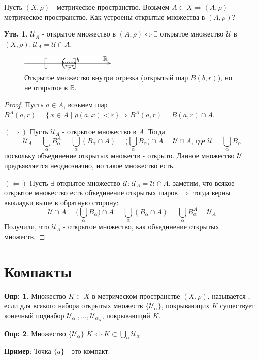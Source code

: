 \documentclass[12pt]{article}
\newcommand{\MR}{\mathbb{R}}
\newcommand{\MU}{\mathcal{U}}
\theoremstyle{definition}
\newtheorem{defn}{Опр:}
\newtheorem{prop}{Утв.}
\begin{document}
Пусть $(X,\rho)$ - метрическое пространство. Возьмем $A \subset X \Rightarrow (A,\rho)$ - метрическое пространство. Как устроены открытые множества в $(A,\rho)$?
\begin{prop}
	$\MU_A$ - открытое множество в $(A,\rho) \Leftrightarrow \exists$ открытое множество $\MU$ в $(X,\rho) \colon \MU_A = \MU \cap A$.
\end{prop}
\begin{figure}[H]
	\centering
	\includegraphics[width=0.4\textwidth]{8_2.png}
	\caption{Открытое множество внутри отрезка (открытый шар $B(b,r)$), но не открытое в $\MR$.}
	\label{8_2}
\end{figure}
\begin{proof}
	Пусть $a \in A$, возьмем шар $B^A(a,r) = \{\, x\in A \mid \rho(a,x) < r \,\} \Rightarrow B^A(a,r) = B(a,r) \cap A$. 
	
	$(\Rightarrow)$ Пусть $\MU_A$ - открытое множество в $A$. Тогда 
	$$
		\MU_A = \textstyle\bigcup\limits_{\alpha} B_\alpha^A = \textstyle\bigcup\limits_{\alpha} (B_\alpha \cap A) = \bigg(\textstyle\bigcup\limits_{\alpha} B_\alpha\bigg) \cap A = \MU \cap A \text{, где } \MU = \textstyle\bigcup\limits_{\alpha} B_\alpha
	$$
	поскольку объединение открытых множеств - открыто. Данное множество $\MU$ предъявляется неоднозначно, но такое множество есть.
	
	$(\Leftarrow)$ Пусть $\exists$ открытое множество $\MU \colon \MU_A = \MU \cap A$, заметим, что всякое открытое множество есть объединение открытых шаров $\Rightarrow$ тогда верны выкладки выше в обратную сторону:
	$$
 		 \MU \cap A =  \bigg(\textstyle\bigcup\limits_{\alpha} B_\alpha\bigg) \cap A = \textstyle\bigcup\limits_{\alpha} (B_\alpha \cap A)  = \textstyle\bigcup\limits_{\alpha} B_\alpha^A = \MU_A 
	$$
	Получили, что $\MU_A$ - открытое множество, как объединение открытых множеств.
\end{proof}
\newpage
\section*{Компакты}

\begin{defn}
	Множество $K \subset X$ в метрическом пространстве $(X,\rho)$, называется , если для всякого набора открытых множеств $\{\MU_\alpha\}$, покрывающих $K$ существует конечный поднабор $\MU_{\alpha_1}, \dotsc, \MU_{\alpha_N}$, покрывающий $K$.
\end{defn}
\begin{defn}
	Множество $\{\MU_\alpha\}$  $K \Leftrightarrow K \subset \textstyle \bigcup\limits_\alpha \MU_\alpha$.
\end{defn}
\textbf{Пример}: Точка $\{a\}$ - это компакт.
\end{document}
